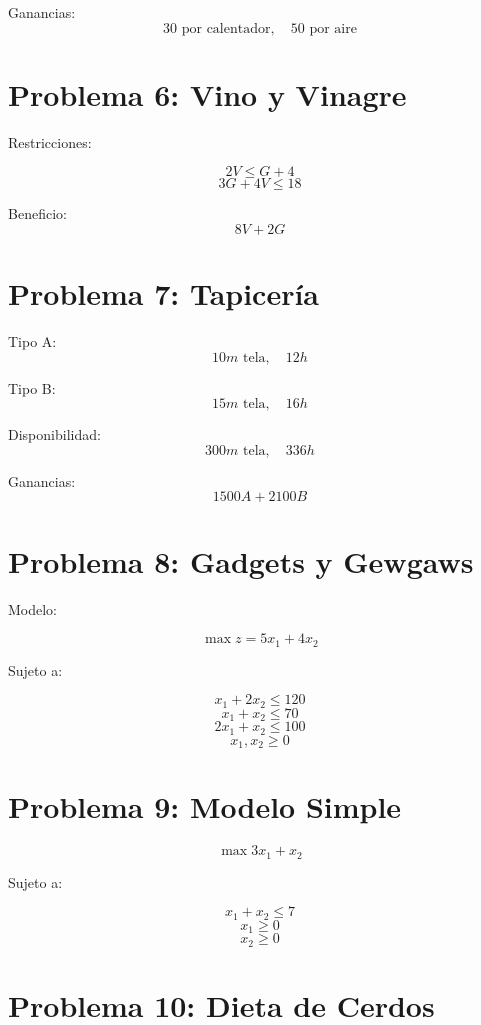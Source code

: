 \documentclass[12pt]{article}
\begin{document}
Ganancias:
\[
30 \text{ por calentador}, \quad 50 \text{ por aire}
\]

\section*{Problema 6: Vino y Vinagre}

Restricciones:

\[
2V \leq G + 4
\]
\[
3G + 4V \leq 18
\]

Beneficio:
\[
8V + 2G
\]

\section*{Problema 7: Tapicería}

Tipo A:
\[
10m \text{ tela}, \quad 12h
\]

Tipo B:
\[
15m \text{ tela}, \quad 16h
\]

Disponibilidad:
\[
300m \text{ tela}, \quad 336h
\]

Ganancias:
\[
1500A + 2100B
\]

\section*{Problema 8: Gadgets y Gewgaws}

Modelo:

\[
\max z = 5x_1 + 4x_2
\]

Sujeto a:

\[
x_1 + 2x_2 \leq 120
\]
\[
x_1 + x_2 \leq 70
\]
\[
2x_1 + x_2 \leq 100
\]
\[
x_1, x_2 \geq 0
\]

\section*{Problema 9: Modelo Simple}

\[
\max 3x_1 + x_2
\]

Sujeto a:

\[
x_1 + x_2 \leq 7
\]
\[
x_1 \geq 0
\]
\[
x_2 \geq 0
\]

\section*{Problema 10: Dieta de Cerdos}
\end{document}
